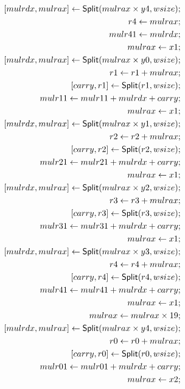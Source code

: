 \begin{align*}
\concat{mulrdx}{mulrax} \leftarrow \dslcode{Split}(mulrax \times y4, wsize); \\
r4 \leftarrow mulrax; \\
mulr41 \leftarrow mulrdx; \\
mulrax \leftarrow x1; \\
\concat{mulrdx}{mulrax} \leftarrow \dslcode{Split}(mulrax \times y0, wsize); \\
r1 \leftarrow r1 + mulrax; \\
\concat{carry}{r1} \leftarrow \dslcode{Split}(r1, wsize); \\
mulr11 \leftarrow mulr11 + mulrdx + carry; \\
mulrax \leftarrow x1; \\
\concat{mulrdx}{mulrax} \leftarrow \dslcode{Split}(mulrax \times y1, wsize); \\
r2 \leftarrow r2 + mulrax; \\
\concat{carry}{r2} \leftarrow \dslcode{Split}(r2, wsize); \\
mulr21 \leftarrow mulr21 + mulrdx + carry; \\
mulrax \leftarrow x1; \\
\concat{mulrdx}{mulrax} \leftarrow \dslcode{Split}(mulrax \times y2, wsize); \\
r3 \leftarrow r3 + mulrax; \\
\concat{carry}{r3} \leftarrow \dslcode{Split}(r3, wsize); \\
mulr31 \leftarrow mulr31 + mulrdx + carry; \\
mulrax \leftarrow x1; \\
\concat{mulrdx}{mulrax} \leftarrow \dslcode{Split}(mulrax \times y3, wsize); \\
r4 \leftarrow r4 + mulrax; \\
\concat{carry}{r4} \leftarrow \dslcode{Split}(r4, wsize); \\
mulr41 \leftarrow mulr41 + mulrdx + carry; \\
mulrax \leftarrow x1; \\
mulrax \leftarrow mulrax \times 19; \\
\concat{mulrdx}{mulrax} \leftarrow \dslcode{Split}(mulrax \times y4, wsize); \\
r0 \leftarrow r0 + mulrax; \\
\concat{carry}{r0} \leftarrow \dslcode{Split}(r0, wsize); \\
mulr01 \leftarrow mulr01 + mulrdx + carry; \\
mulrax \leftarrow x2; \\

\end{align*}
